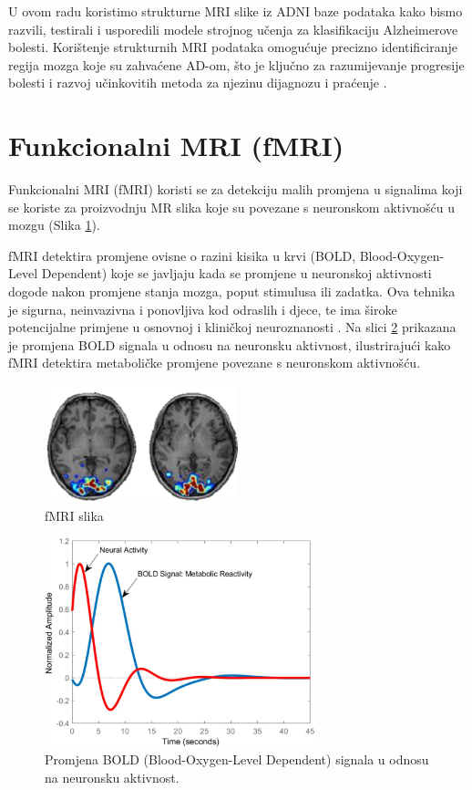 \documentclass[zavrsnirad,upload]{fer}
\begin{document}
 U ovom radu koristimo strukturne MRI slike iz ADNI baze podataka kako bismo razvili, testirali i usporedili modele strojnog učenja za klasifikaciju Alzheimerove bolesti. Korištenje strukturnih MRI podataka omogućuje precizno identificiranje regija mozga koje su zahvaćene AD-om, što je ključno za razumijevanje progresije bolesti i razvoj učinkovitih metoda za njezinu dijagnozu i praćenje \cite{Gonuguntla2022}.


\section{Funkcionalni MRI (fMRI)}

Funkcionalni MRI (fMRI) koristi se za detekciju malih promjena u signalima koji se koriste za proizvodnju MR slika koje su povezane s neuronskom aktivnošću u mozgu (Slika \ref{fig:fMRI}). 

fMRI detektira promjene ovisne o razini kisika u krvi (BOLD, Blood-Oxygen-Level Dependent) koje se javljaju kada se promjene u neuronskoj aktivnosti dogode nakon promjene stanja mozga, poput stimulusa ili zadatka. Ova tehnika je sigurna, neinvazivna i ponovljiva kod odraslih i djece, te ima široke potencijalne primjene u osnovnoj i kliničkoj neuroznanosti \cite{Gore2003}. Na slici \ref{fig:fMRI_BOLD} prikazana je promjena BOLD signala u odnosu na neuronsku aktivnost, ilustrirajući kako fMRI detektira metaboličke promjene povezane s neuronskom aktivnošću.


\begin{figure}[h]
	\centering
	\includegraphics[width=0.5\textwidth]{Figures/fMRI.png}
	\caption{fMRI slika \cite{ucsd2021}}
	\label{fig:fMRI}
\end{figure}

\begin{figure}[h]
	\centering
	\includegraphics[width=0.7\textwidth]{Figures/BOLD.jpg}
	\caption{Promjena BOLD (Blood-Oxygen-Level Dependent) signala u odnosu na neuronsku aktivnost.\cite{Schaper573006}}
	\label{fig:fMRI_BOLD}
\end{figure}
\end{document}
